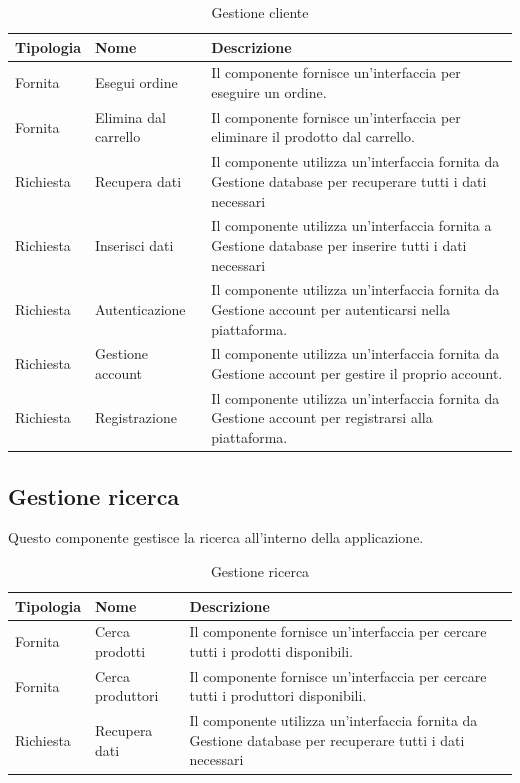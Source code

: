 \begin{table}[htbp!]
    \centering
    \begin{tabularx}{0.9\textwidth}{ >{\centering\arraybackslash}X | >{\centering\arraybackslash}X | m{8cm}}
        \hline
        \textbf{Tipologia} & \textbf{Nome}  & \textbf{Descrizione}\\
        \hline
        Fornita & Esegui ordine & Il componente fornisce un'interfaccia per eseguire un ordine.\\
        \hline
        Fornita & Elimina dal carrello & Il componente fornisce un'interfaccia per eliminare il prodotto dal carrello.\\
        \hline
        Richiesta &  Recupera dati & Il componente utilizza un'interfaccia fornita da Gestione database per recuperare tutti i dati necessari\\
        \hline
        Richiesta &  Inserisci dati & Il componente utilizza un'interfaccia fornita a Gestione database per inserire tutti i dati necessari\\
        \hline
        Richiesta &  Autenticazione & Il componente utilizza un'interfaccia fornita da Gestione account per autenticarsi nella piattaforma.\\
        \hline        
        Richiesta &  Gestione account & Il componente utilizza un'interfaccia fornita da Gestione account per gestire il proprio account.\\
        \hline
        Richiesta &  Registrazione & Il componente utilizza un'interfaccia fornita da Gestione account per registrarsi alla piattaforma.\\
        \hline
    \end{tabularx}
    \caption{Gestione cliente}
    \label{tab:gestione-cliente}
\end{table}

\subsection{Gestione ricerca}
Questo componente gestisce la ricerca all'interno della applicazione.


\begin{table}[htbp!]
    \centering
    \begin{tabularx}{0.9\textwidth}{ >{\centering\arraybackslash}X | >{\centering\arraybackslash}X | m{8cm}}
        \hline
        \textbf{Tipologia} & \textbf{Nome}  & \textbf{Descrizione}\\
        \hline
        Fornita & Cerca prodotti & Il componente fornisce un'interfaccia per cercare tutti i prodotti disponibili.\\
        \hline
        Fornita & Cerca produttori & Il componente fornisce un'interfaccia per cercare tutti i produttori disponibili.\\
        \hline
        Richiesta &  Recupera dati & Il componente utilizza un'interfaccia fornita da Gestione database per recuperare tutti i dati necessari\\
        \hline
    \end{tabularx}
    \caption{Gestione ricerca}
    \label{tab:gestione-ricerca}
\end{table}

